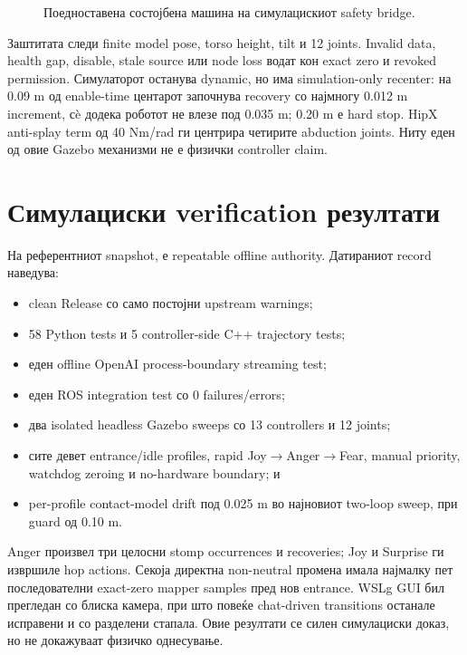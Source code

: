 \begin{figure}[htbp]
\centering

\caption{Поедноставена состојбена машина на симулацискиот safety bridge.}
\label{fig:simulation-safety}
\end{figure}

Заштитата следи finite model pose, torso height, tilt и 12 joints. Invalid data,
health gap, disable, stale source или node loss водат кон exact zero и revoked
permission. Симулаторот останува dynamic, но има simulation-only recenter:
на 0.09 m од enable-time центарот започнува recovery со најмногу 0.012 m
increment, сè додека роботот не влезе под 0.035 m; 0.20 m е hard stop. HipX
anti-splay term од 40 Nm/rad ги центрира четирите abduction joints. Ниту еден
од овие Gazebo механизми не е физички controller claim.

\section{Симулациски verification резултати}

На референтниот snapshot,  е
repeatable offline authority. Датираниот record наведува:

\begin{itemize}
  \item clean Release  со само постојни upstream warnings;
  \item 58 Python tests и 5 controller-side C++ trajectory tests;
  \item еден offline OpenAI process-boundary streaming test;
  \item еден ROS integration test со 0 failures/errors;
  \item два isolated headless Gazebo sweeps со 13 controllers и 12 joints;
  \item сите девет entrance/idle profiles, rapid Joy$\rightarrow$Anger$\rightarrow$Fear,
  manual priority, watchdog zeroing и no-hardware boundary; и
  \item per-profile contact-model drift под 0.025 m во најновиот two-loop sweep,
  при guard од 0.10 m.
\end{itemize}

Anger произвел три целосни stomp occurrences и recoveries; Joy и Surprise ги
извршиле hop actions. Секоја директна non-neutral промена имала најмалку пет
последователни exact-zero mapper samples пред нов entrance. WSLg GUI бил
прегледан со блиска камера, при што повеќе chat-driven transitions останале
исправени и со разделени стапала. Овие резултати се силен симулациски доказ,
но не докажуваат физичко однесување.

